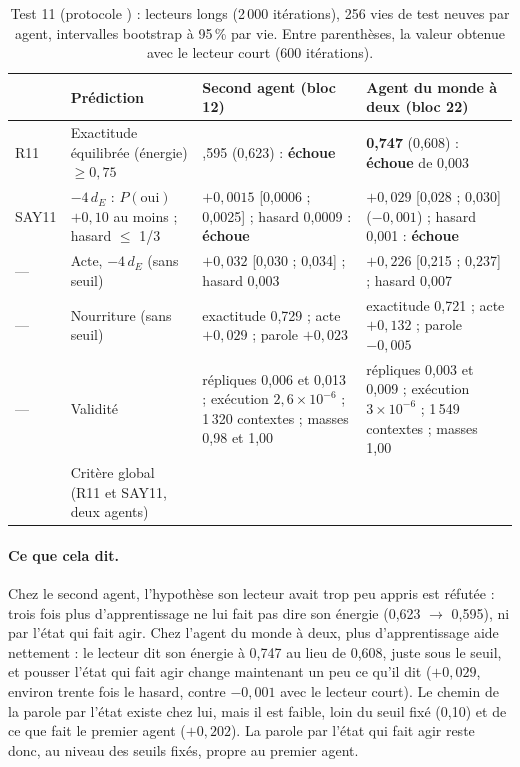 \documentclass[11pt,a4paper]{article}
\newcommand{\dE}{d_{E}}
\newcommand{\code}[1]{\texttt{\detokenize{#1}}}
\begin{document}
\begin{table}[t]
\centering
\caption{Test 11 (protocole \code{0a28560}) : lecteurs longs (2\,000 itérations),
256 vies de test neuves par agent, intervalles bootstrap à 95\,\% par vie. Entre
parenthèses, la valeur obtenue avec le lecteur court (600 itérations).}
\label{tab-t11}
\small
\begin{tabularx}{\textwidth}{@{}l >{\raggedright\arraybackslash}p{3.3cm} >{\raggedright\arraybackslash}X >{\raggedright\arraybackslash}X@{}}
\toprule
& Prédiction & Second agent (bloc 12) & Agent du monde à deux (bloc 22) \\
\midrule
R11 & Exactitude équilibrée (énergie) $\ge0,75$ & 0,595 (0,623) : \textbf{échoue} & \textbf{0,747} (0,608) : \textbf{échoue} de 0,003 \\
SAY11 & $-4\,\dE$ : $P(\text{oui})$ $+0,10$ au moins ; hasard $\le$ 1/3 & $+0,0015$ [0,0006 ; 0,0025] ; hasard 0,0009 : \textbf{échoue} & $+0,029$ [0,028 ; 0,030] ($-0,001$) ; hasard 0,001 : \textbf{échoue} \\
--- & Acte, $-4\,\dE$ (sans seuil) & $+0,032$ [0,030 ; 0,034] ; hasard 0,003 & $+0,226$ [0,215 ; 0,237] ; hasard 0,007 \\
--- & Nourriture (sans seuil) & exactitude 0,729 ; acte $+0,029$ ; parole $+0,023$ & exactitude 0,721 ; acte $+0,132$ ; parole $-0,005$ \\
--- & Validité & répliques 0,006 et 0,013 ; exécution $2,6\times10^{-6}$ ; 1\,320 contextes ; masses 0,98 et 1,00 & répliques 0,003 et 0,009 ; exécution $3\times10^{-6}$ ; 1\,549 contextes ; masses 1,00 \\
\midrule
& Critère global (R11 et SAY11, deux agents) & \multicolumn{2}{l}{\textbf{non satisfait}} \\
\bottomrule
\end{tabularx}
\end{table}

\paragraph{Ce que cela dit.} Chez le second agent, l'hypothèse \og son lecteur avait
trop peu appris \fg{} est réfutée : trois fois plus d'apprentissage ne lui fait pas
dire son énergie (0,623 $\to$ 0,595), ni par l'état qui fait agir. Chez l'agent du
monde à deux, plus d'apprentissage aide nettement : le lecteur dit son énergie à
0,747 au lieu de 0,608, juste sous le seuil, et pousser l'état qui fait agir change
maintenant un peu ce qu'il dit ($+0,029$, environ trente fois le hasard, contre
$-0,001$ avec le lecteur court). Le chemin de la parole par l'état existe chez lui,
mais il est faible, loin du seuil fixé (0,10) et de ce que fait le premier agent
($+0,202$). La parole par l'état qui fait agir reste donc, au niveau des seuils
fixés, propre au premier agent.
\end{document}
